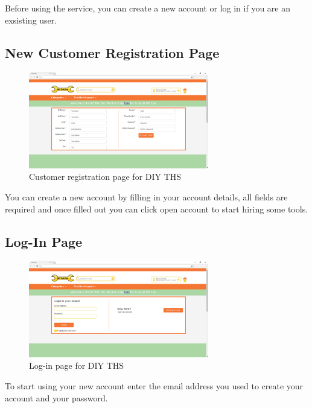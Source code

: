 Before using the service, you can create a new account or log in if you
are an exsisting user.

\hypertarget{new-customer-registration-page}{%
\subsection{New Customer Registration
Page}\label{new-customer-registration-page}}

\begin{figure}[H]
      \centering
      \includegraphics[trim = 0 0 0 0, clip, width=0.7\textwidth]{TempImg/open_account.jpg}
      \caption{Customer registration page for DIY THS}
 \end{figure}

You can create a new account by filling in your account details, all
fields are required and once filled out you can click open account to
start hiring some tools.

\hypertarget{log-in-page}{%
\subsection{Log-In Page}\label{log-in-page}}

\begin{figure}[H]
      \centering
      \includegraphics[trim = 0 0 0 0, clip, width=0.7\textwidth]{TempImg/login_screen.jpg}
      \caption{Log-in page for DIY THS}
 \end{figure}

To start using your new account enter the email address you used to
create your account and your password.

